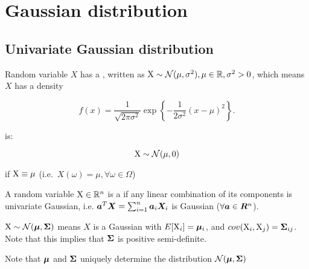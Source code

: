 \chapter{Gaussian distribution}


\section{Univariate Gaussian distribution}

\begin{defn}
    Random variable $X$ has a , written as ${\textnormal{X}} \sim {\mathcal{N}}(\mu, \sigma^2), \mu \in {\mathbb{R}}, \sigma^2 > 0$, which means $X$ has a density
    
    \begin{equation}
        f(x) = \frac{1}{\sqrt{2 \pi \sigma^2}} \exp{ \left\{ -\frac{1}{2\sigma^2} (x - \mu)^2 \right\}}.
    \end{equation}
\end{defn}

\begin{defn}
     is:
    
    \begin{equation}
        {\textnormal{X}} \sim {\mathcal{N}}(\mu, 0)
    \end{equation}
    
    if ${\textnormal{X}} \equiv \mu$ (i.e.\ $X(\omega) = \mu, \forall \omega \in \Omega$)
\end{defn}

\begin{defn}
    A random variable ${\textnormal{X}} \in {\mathbb{R}}^n$ is a  if any linear combination of its components is univariate Gaussian, i.e. ${\bm{a}}^T {\bm{X}} = \sum_{i=1}^n {\bm{a}}_i {\bm{X}}_i$ is Gaussian ($\forall {\bm{a}} \in {\bm{R}}^n$).
    
\end{defn}

\begin{defn}
    ${\textnormal{X}} \sim {\mathcal{N}}({\bm{\mu}}, {\bm{\Sigma}})$ means $X$ is a Gaussian with $E[{\textnormal{X}}_i] = {\bm{\mu}}_i$, and $cov({\textnormal{X}}_i, {\textnormal{X}}_j) = {\bm{\Sigma}}_{ij}$. Note that this implies that ${\bm{\Sigma}}$ is positive semi-definite.
\end{defn}

\begin{rem}
    Note that ${\bm{\mu}}$ and ${\bm{\Sigma}}$ uniquely determine the distribution ${\mathcal{N}}({\bm{\mu}}, {\bm{\Sigma}})$
\end{rem}

